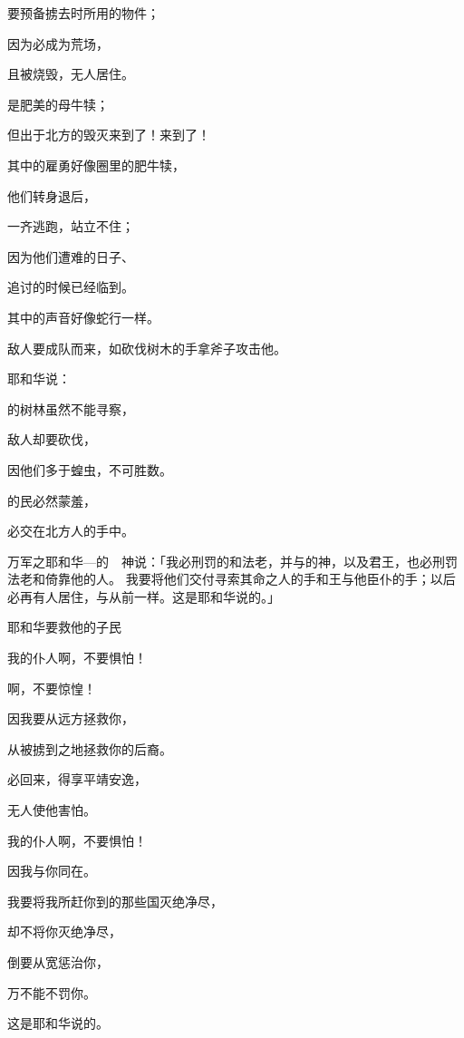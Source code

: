 {\par }{\Q 要预备掳去时所用的物件；
\par }{\Q 因为{}必成为荒场，
\par }{\Q 且被烧毁，无人居住。
\par }{\BB \par }{\Q {}是肥美的母牛犊；
\par }{\Q 但出于北方的毁灭来到了！来到了！
\par }{\Q {}其中的雇勇好像圈里的肥牛犊，
\par }{\Q 他们转身退后，
\par }{\Q 一齐逃跑，站立不住；
\par }{\Q 因为他们遭难的日子、
\par }{\Q 追讨的时候已经临到。
\par }{\BB \par }{\Q {}其中的声音好像蛇行一样。
\par }{\Q 敌人要成队而来，如砍伐树木的手拿斧子攻击他。
\par }{\Q {}耶和华说：
\par }{的树林虽然不能寻察，
\par }{\Q 敌人却要砍伐，
\par }{\Q 因他们多于蝗虫，不可胜数。
\par }{\Q {}的民必然蒙羞，
\par }{\Q 必交在北方人的手中。
\par }{\PP {}万军之耶和华—{}的　神说：「我必刑罚{}的{}和法老，并{}与{}的神，以及君王，也必刑罚法老和倚靠他的人。
我要将他们交付寻索其命之人的手和{}王{}与他臣仆的手；以后{}必再有人居住，与从前一样。这是耶和华说的。」
\par }{\SH 耶和华要救他的子民
\par }{\Q {}我的仆人{}啊，不要惧怕！
\par }{啊，不要惊惶！
\par }{\Q 因我要从远方拯救你，
\par }{\Q 从被掳到之地拯救你的后裔。
\par }{必回来，得享平靖安逸，
\par }{\Q 无人使他害怕。
\par }{\Q {}我的仆人{}啊，不要惧怕！
\par }{\Q 因我与你同在。
\par }{\Q 我要将我所赶你到的那些国灭绝净尽，
\par }{\Q 却不将你灭绝净尽，
\par }{\Q 倒要从宽惩治你，
\par }{\Q 万不能不罚你。
\par }{\Q 这是耶和华说的。

}
